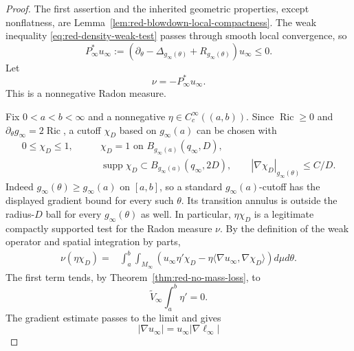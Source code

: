 \documentclass[10pt]{coll-l}
\newcommand{\supp}{\operatorname{supp}}
\theoremstyle{definition}
\theoremstyle{remark}
\numberwithin{section}{chapter}
\numberwithin{equation}{chapter}
\newcommand{\Ric}{\operatorname{Ric}}
\begin{document}
\begin{proof}
The first assertion and the inherited geometric properties, except
nonflatness, are Lemma~\ref{lem:red-blowdown-local-compactness}.  The weak
inequality \eqref{eq:red-density-weak-test} passes through smooth local
convergence, so
\begin{equation}
 P_\infty^*u_\infty
 :=(\partial_\theta-\Delta_{g_\infty(\theta)}
                 +R_{g_\infty(\theta)})u_\infty\leq0.   \label{eq:red-limit-weak-subsolution}
\end{equation}
Let
\begin{equation}
                         \nu=-P_\infty^*u_\infty.        \label{eq:red-limit-defect}
\end{equation}
This is a nonnegative Radon measure.

Fix $0<a<b<\infty$ and a nonnegative
$\eta\in C_c^\infty((a,b))$.  Since $\Ric\geq0$ and
$\partial_\theta g_\infty=2\Ric$, a cutoff $\chi_D$ based on
$g_\infty(a)$ can be chosen with
\begin{align}
 0\leq\chi_D\leq1,\qquad
 &\chi_D=1\text{ on }B_{g_\infty(a)}(q_\infty,D),      \label{eq:red-limit-cutoff}\\
 &\supp\chi_D\subset B_{g_\infty(a)}(q_\infty,2D),
 \qquad |\nabla\chi_D|_{g_\infty(\theta)}\leq C/D.\nonumber
\end{align}
Indeed $g_\infty(\theta)\geq g_\infty(a)$ on $[a,b]$, so a standard
$g_\infty(a)$-cutoff has the displayed gradient bound for every such
$\theta$.  Its transition annulus is outside the radius-$D$ ball for every
$g_\infty(\theta)$ as well.  In particular, $\eta\chi_D$ is a legitimate
compactly supported test for the Radon measure $\nu$.
By the definition of the weak operator and spatial integration by parts,
\begin{align}
 \nu(\eta\chi_D)
={}&\int_a^b\!\!\int_{M_\infty}
  \left(u_\infty\eta'\chi_D
       -\eta\langle\nabla u_\infty,\nabla\chi_D\rangle\right)
                  d\mu d\theta.                        \label{eq:red-limit-defect-cutoff}
\end{align}
The first term tends, by Theorem~\ref{thm:red-no-mass-loss}, to
\begin{equation}
                      \widetilde V_\infty\int_a^b\eta'=0.
                                                               \label{eq:red-limit-defect-time-zero}
\end{equation}
The gradient estimate passes to the limit and gives
\begin{equation}
 |\nabla u_\infty|
 =u_\infty|\nabla\ell_\infty|

\end{equation}
\end{proof}
\end{document}
